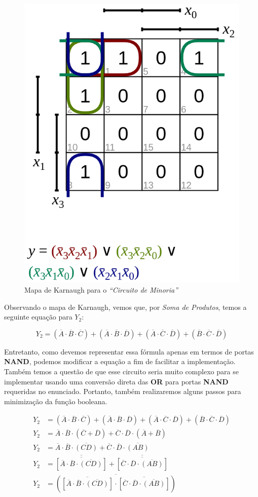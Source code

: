 \documentclass[12pt]{article}
\begin{document}
\begin{figure}[H]
    \centering
    \includegraphics[width=.5\textwidth]{Exp03/2_2_karnaugh_map.png}
    \caption{Mapa de Karnaugh para o \textit{``Circuito de Minoria''}}\label{fig:2_2_karnaugh_map.png}
\end{figure}

Observando o mapa de Karnaugh, vemos que, por \textit{Soma de Produtos}, temos a
seguinte equação para \(Y_{2}\):

\begin{equation}
  Y_{2} = (\overline{A} \cdot \overline{B} \cdot \overline{C}) + (\overline{A} \cdot \overline{B} \cdot \overline{D}) + (\overline{A} \cdot \overline{C} \cdot \overline{D}) + (\overline{B} \cdot \overline{C} \cdot \overline{D})
\end{equation}

Entretanto, como devemos representar essa fórmula apenas em termos de portas
\textbf{NAND}, podemos modificar a equação a fim de facilitar a implementação.
Também temos a questão de que esse circuito seria muito complexo para se
implementar usando uma conversão direta das \textbf{OR} para portas
\textbf{NAND} requeridas no enunciado. Portanto, também realizaremos alguns
passos para minimização da função booleana.

\begin{align}
  Y_{2} &= (\overline{A} \cdot \overline{B} \cdot \overline{C}) + (\overline{A} \cdot \overline{B} \cdot \overline{D}) + (\overline{A} \cdot \overline{C} \cdot \overline{D}) + (\overline{B} \cdot \overline{C} \cdot \overline{D})\\
  Y_{2} &= \overline{A}\cdot \overline{B} \cdot (\overline{C} + \overline{D}) + \overline{C} \cdot \overline{D} \cdot (\overline{A} + \overline{B})\\
  Y_{2} &= \overline{A}\cdot\overline{B} \cdot \overline{(CD)} + \overline{C}\cdot\overline{D} \cdot \overline{(AB)}\\
  Y_{2} &= \overline{\overline{ \left[ \overline{A}\cdot\overline{B} \cdot \overline{(CD)} \right] }} + \overline{\overline{ \left[ \overline{C}\cdot\overline{D} \cdot \overline{(AB)} \right] }}\\
  Y_{2} &= \overline{ \left( \overline{ \left[ \overline{A}\cdot\overline{B} \cdot \overline{(CD)} \right] } \cdot  \overline{ \left[ \overline{C}\cdot\overline{D} \cdot \overline{(AB)} \right] } \right)} \label{eq:2.2_NAND}
\end{align}
\end{document}
